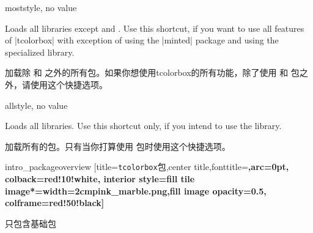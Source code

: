 




\begin{docTcbKey}[library]{most}{}{style, no value}

Loads all libraries except  and .
Use this shortcut, if you want to use all features of |tcolorbox|
with exception of using the |minted| package and using
the specialized  library.

加载除  和  之外的所有包。如果你想使用tcolorbox的所有功能，除了使用  和  包之外，请使用这个快捷选项。
\end{docTcbKey}

\begin{docTcbKey}[library]{all}{}{style, no value}

Loads all libraries. Use this shortcut only, if you intend to use the
 library.

加载所有的包。只有当你打算使用  包时使用这个快捷选项。

\end{docTcbKey}


\begin{extcolorbox}[runs=2]%
{intro_packageoverview}
[title={\texttt{tcolorbox}包},center title,fonttitle=\bfseries,arc=0pt,
colback=red!10!white,
interior style={fill tile image*={width=2cm}{pink_marble.png},fill image opacity=0.5},
colframe=red!50!black]
\begin{tcolorbox}[beamer,adjusted title=基本特性,colframe=blue!50!black,colback=blue!10!white]
只包含基础包
\end{tcolorbox}
\begin{tcbitemize}[raster columns=3,raster before skip=2mm,raster after skip=0pt,
  raster equal height,beamer,colframe=blue!50!black,colback=blue!10!white]
\tcbitem[adjusted title=进阶特性]
  \\
  \\
  \\
  \\
  \\
  \\
  \\ 
  \\
  \\
  \\
\tcbitem[adjusted title=进阶的代码列表]
  \\
  \tcblower
\tcbitem[adjusted title=编写文档用]
\end{tcbitemize}
\end{extcolorbox}